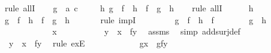 \begin{isabellebody}
%
\endisadelimproof
%
\isatagproof
{}\isamarkupfalse%
\ {\isacharparenleft}rule\ allI{\isacharparenright}\isanewline
\ \ \isamarkupfalse%
\ g\ {\isacharcolon}{\isacharcolon}\ {\isachardoublequoteopen}{\isacharprime}a\ {\isasymRightarrow}{\isacharprime}c{\isachardoublequoteclose}\ \isanewline
\ \ \isamarkupfalse%
\ {\isachardoublequoteopen}{\isasymforall}h{\isachardot}\ {\isacharparenleft}g\ {\isasymcirc}\ f\ {\isacharequal}\ h\ {\isasymcirc}\ f{\isacharparenright}\ {\isasymlongrightarrow}\ {\isacharparenleft}g\ {\isacharequal}\ h{\isacharparenright}{\isachardoublequoteclose}\isanewline
\ \ \isamarkupfalse%
\ {\isacharparenleft}rule\ allI{\isacharparenright}\isanewline
\ \ \ \ \isamarkupfalse%
\ h\isanewline
\ \ \ \ \isamarkupfalse%
\ {\isachardoublequoteopen}{\isacharparenleft}g\ {\isasymcirc}\ f\ {\isacharequal}\ h\ {\isasymcirc}\ f{\isacharparenright}\ {\isasymlongrightarrow}\ {\isacharparenleft}g\ {\isacharequal}\ h{\isacharparenright}{\isachardoublequoteclose}\ \isanewline
\ \ \ \ \isamarkupfalse%
\ {\isacharparenleft}rule\ impI{\isacharparenright}\isanewline
\ \ \ \ \ \ \isamarkupfalse%
\ {}{\isacharcolon}\ {\isachardoublequoteopen}g\ {\isasymcirc}\ f\ {\isacharequal}\ h\ {\isasymcirc}\ f{\isachardoublequoteclose}\isanewline
\ \ \ \ \ \ \isamarkupfalse%
\ {\isachardoublequoteopen}g\ {\isacharequal}\ h{\isachardoublequoteclose}\isanewline
\ \ \ \ \ \ \isamarkupfalse%
\ \ \isanewline
\ \ \ \ \ \ \ \ \isamarkupfalse%
\ x\isanewline
\ \ \ \ \ \ \ \ \isamarkupfalse%
\ {\isachardoublequoteopen}\ {\isasymexists}y\ {\isachardot}\ x\ {\isacharequal}\ f{\isacharparenleft}y{\isacharparenright}{\isachardoublequoteclose}\ \isamarkupfalse%
\ assms\ \isamarkupfalse%
\ {\isacharparenleft}simp\ add{\isacharcolon}surj{\isacharunderscore}def{\isacharparenright}\isanewline
\ \ \ \ \ \ \ \ \isamarkupfalse%
\ \isamarkupfalse%
\ \ {\isachardoublequoteopen}y{\isachardoublequoteclose}\ \ {}{\isacharcolon}{\isachardoublequoteopen}x\ {\isacharequal}\ f{\isacharparenleft}y{\isacharparenright}{\isachardoublequoteclose}\ \isamarkupfalse%
\ {\isacharparenleft}rule\ exE{\isacharparenright}\isanewline
\ \ \ \ \ \ \ \ \isamarkupfalse%
\ \isamarkupfalse%
\ \ {\isachardoublequoteopen}g{\isacharparenleft}x{\isacharparenright}\ {\isacharequal}\ g{\isacharparenleft}f{\isacharparenleft}y{\isacharparenright}{\isacharparenright}{\isachardoublequoteclose}\ \isamarkupfalse%

\end{isabellebody}
